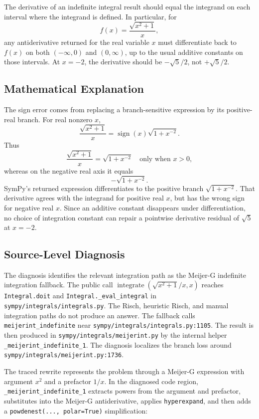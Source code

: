 \documentclass[11pt]{article}
\begin{document}
The derivative of an indefinite integral result should equal the integrand on
each interval where the integrand is defined. In particular, for
\[
    f(x)=\frac{\sqrt{x^2+1}}{x},
\]
any antiderivative returned for the real variable \(x\) must differentiate back
to \(f(x)\) on both \((-\infty,0)\) and \((0,\infty)\), up to the usual
additive constants on those intervals. At \(x=-2\), the derivative should be
\(-\sqrt{5}/2\), not \(+\sqrt{5}/2\).

\subsection{Mathematical Explanation}

The sign error comes from replacing a branch-sensitive expression by its
positive-real branch. For real nonzero \(x\),
\[
    \frac{\sqrt{x^2+1}}{x}
    =
    \operatorname{sign}(x)\sqrt{1+x^{-2}}.
\]
Thus
\[
    \frac{\sqrt{x^2+1}}{x}
    =
    \sqrt{1+x^{-2}}
    \quad\text{only when } x>0,
\]
whereas on the negative real axis it equals
\[
    -\sqrt{1+x^{-2}}.
\]
SymPy's returned expression differentiates to the positive branch
\(\sqrt{1+x^{-2}}\). That derivative agrees with the integrand for positive
real \(x\), but has the wrong sign for negative real \(x\). Since an additive
constant disappears under differentiation, no choice of integration constant can
repair a pointwise derivative residual of \(\sqrt{5}\) at \(x=-2\).

\subsection{Source-Level Diagnosis}

The diagnosis identifies the relevant integration path as the Meijer-G
indefinite integration fallback. The public call
\(\operatorname{integrate}(\sqrt{x^2+1}/x,x)\) reaches
\texttt{Integral.doit} and \texttt{Integral.\_eval\_integral} in
\nolinkurl{sympy/integrals/integrals.py}. The Risch, heuristic Risch, and
manual integration paths do not produce an answer. The fallback calls
\texttt{meijerint\_indefinite} near
\nolinkurl{sympy/integrals/integrals.py:1105}. The result is then produced in
\nolinkurl{sympy/integrals/meijerint.py} by the internal helper
\texttt{\_meijerint\_}\allowbreak\texttt{indefinite\_1}. The diagnosis
localizes the branch loss around
\nolinkurl{sympy/integrals/meijerint.py:1736}.

The traced rewrite represents the problem through a Meijer-G expression with
argument \(x^2\) and a prefactor \(1/x\). In the diagnosed code region,
\texttt{\_meijerint\_indefinite\_1} extracts powers from the argument and
prefactor, substitutes into the Meijer-G antiderivative, applies
\texttt{hyperexpand}, and then adds a \texttt{powdenest(..., polar=True)}
simplification:
\end{document}

